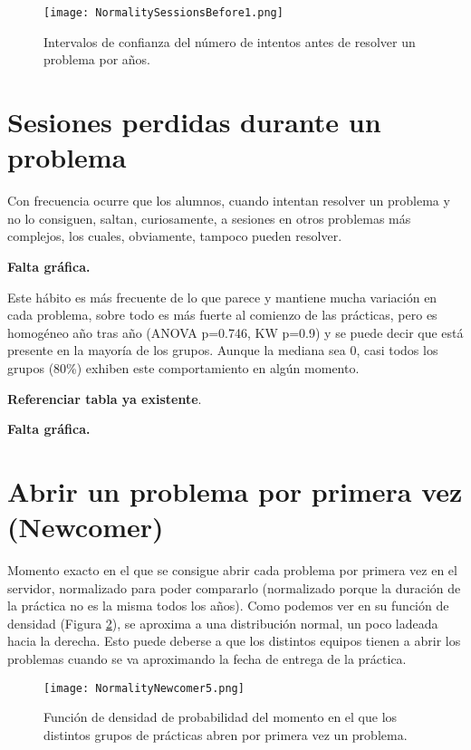 \begin{figure}[H]
    \centering
    \texttt{[image: NormalitySessionsBefore1.png]}
    \caption{Intervalos de confianza del número de intentos antes de resolver un problema por años.}
    \label{fig:confidencesessionsbefore}
\end{figure}

\section{Sesiones perdidas durante un problema}

Con frecuencia ocurre que los alumnos, cuando intentan resolver un problema y no lo consiguen, saltan, curiosamente, a sesiones en otros problemas más complejos, los cuales, obviamente, tampoco pueden resolver.

\textbf{Falta gráfica.}

Este hábito es más frecuente de lo que parece y mantiene mucha variación en cada problema, sobre todo es más fuerte al comienzo de las prácticas, pero es homogéneo año tras año (ANOVA p=0.746, KW p=0.9) y se puede decir que está presente en la mayoría de los grupos. Aunque la mediana sea 0, casi todos los grupos (80\%) exhiben este comportamiento en algún momento.

\textbf{Referenciar tabla ya existente}.

\textbf{Falta gráfica.}

\section{Abrir un problema por primera vez (Newcomer)}

Momento exacto en el que se consigue abrir cada problema por primera vez en el servidor, normalizado para poder compararlo (normalizado porque la duración de la práctica no es la misma todos los años). Como podemos ver en su función de densidad (Figura \ref{fig:densityplotnewcomer}), se aproxima a una distribución normal, un poco ladeada hacia la derecha. Esto puede deberse a que los distintos equipos tienen a abrir los problemas cuando se va aproximando la fecha de entrega de la práctica.

\begin{figure}[H]
    \centering
    \texttt{[image: NormalityNewcomer5.png]}
    \caption{Función de densidad de probabilidad del momento en el que los distintos grupos de prácticas abren por primera vez un problema.}
    \label{fig:densityplotnewcomer}
\end{figure}

